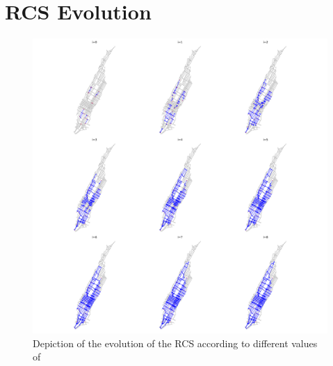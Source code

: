\section{RCS Evolution}
\begin{figure}[h]
	\centering
	\includegraphics[width=\textwidth]{assets/img/appendix_d/evolution_nyc_plot.png}
	\caption{Depiction of the evolution of the RCS according to different values of }
	\label{app:fig:nyc_evolution}
\end{figure}